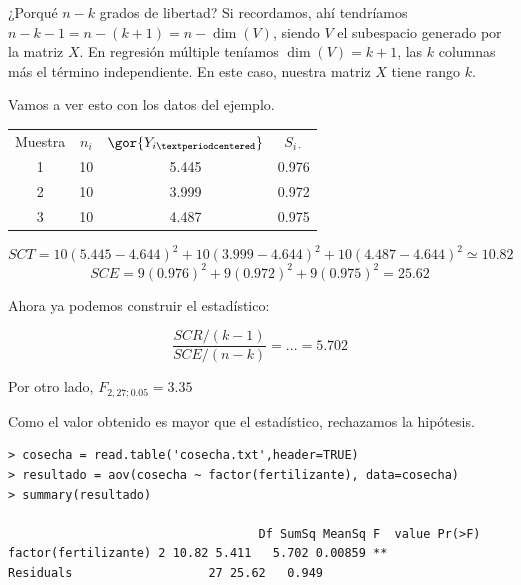 ¿Porqué $n-k$ grados de libertad? Si recordamos, ahí tendríamos $n-k-1 = n-(k+1) = n - \dim(V)$, siendo $V$ el subespacio generado por la matriz $X$. En regresión múltiple teníamos $\dim(V) = k+1$, las $k$ columnas más el término independiente. En este caso, nuestra matriz $X$ tiene rango $k$.

\begin{example}
Vamos a ver esto con los datos del ejemplo.

\begin{center}
\begin{tabular}{cccc}
Muestra & $n_i$ & $\gor{Y_{i·}}$ & $S_{i·}$\\
1 & 10 & 5.445 & 0.976\\
2 & 10 & 3.999 & 0.972\\
3 & 10 & 4.487 & 0.975
\end{tabular}
\end{center}

\[SCT = 10(5.445 - 4.644)^2 + 10(3.999 - 4.644)^2 + 10(4.487 - 4.644)^2 \simeq 10.82\]
\[SCE = 9(0.976)^2 +9(0.972)^2 +9(0.975)^2  = 25.62\]

Ahora ya podemos construir el estadístico:

\[
\frac{SCR/(k-1)}{SCE/(n-k)} = ... = 5.702
\]

Por otro lado, $F_{2,27;0.05} = 3.35$

Como el valor obtenido es mayor que el estadístico, rechazamos la hipótesis.

\begin{lstlisting}[style=mystyle]
> cosecha = read.table('cosecha.txt',header=TRUE)
> resultado = aov(cosecha ~ factor(fertilizante), data=cosecha)
> summary(resultado)

							       Df SumSq MeanSq F  value Pr(>F)
factor(fertilizante) 2 10.82 5.411   5.702 0.00859 **
Residuals 					27 25.62   0.949
\end{lstlisting}

\end{example}
